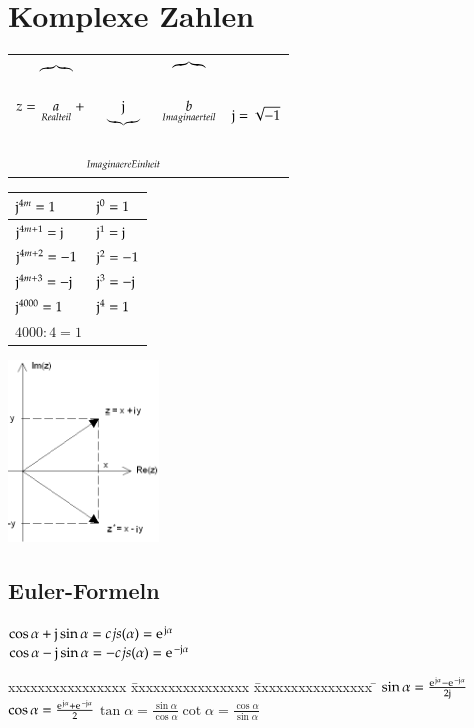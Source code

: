 \section{Komplexe Zahlen}
\begin{minipage}{10cm}
	\begin{tabular}{c c}
		$z=\overbrace{a}_{Realteil}+\underbrace{\im}_{Imaginaere Einheit} \overbrace{b}_{Imaginaerteil}$&$\im=\sqrt{-1}$\\
	\end{tabular}
	
	\begin{tabular}{|l|l|}
		\hline $\im^{4m}=1$ & $\im^{0}=1$\\
		\hline $\im^{4m+1}=\im$ & $\im^{1}=\im$\\
		\hline $\im^{4m+2}=-1$ & $\im^{2}=-1$\\
		\hline $\im^{4m+3}=-\im$ & $\im^{3}=-\im$\\
		\hline $\im^{4000}=1$& $\im^{4}=1$\\
		$4000:4=1$& \\
		\hline
	\end{tabular}
\end{minipage}
\begin{minipage}{4cm}
	\includegraphics[width=4cm]{images/komplexe_zahlen.png}
\end{minipage}

\subsection{Euler-Formeln} 
$\cos{\alpha}+\im \sin{\alpha} = cjs(\alpha)= \e^{\im \alpha}$\\
$\cos{\alpha}-\im \sin{\alpha} = -cjs(\alpha)= \e^{-\im \alpha}$

\begin{tabbing}
		xxxxxxxxxxxxxxxx \= xxxxxxxxxxxxxxxx \= xxxxxxxxxxxxxxxx \=\kill
		$\sin{\alpha}=\frac{\e^{\im\alpha}-\e^{-\im\alpha}}{2\im}$\> $\cos{\alpha}=\frac{\e^{\im\alpha}+\e^{-\im\alpha}}{2}$\>$\tan{\alpha}=\frac{\sin{\alpha}}{\cos{\alpha}}$\>$\cot{\alpha}=\frac{\cos{\alpha}}{\sin{\alpha}}$
\end{tabbing}
\clearpage
\pagebreak